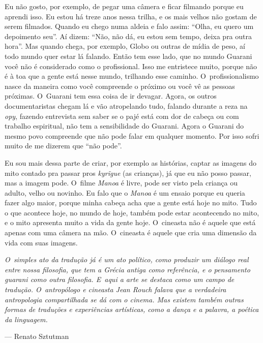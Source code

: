 Eu não gosto, por exemplo, de pegar uma câmera e ficar filmando porque
eu aprendi isso. Eu estou há treze anos nessa trilha, e os mais velhos
não gostam de serem filmados. Quando eu chego numa aldeia e falo assim:
``Olha, eu quero um depoimento seu''. Aí dizem: ``Não, não dá, eu estou
sem tempo, deixa pra outra hora''. Mas quando chega, por exemplo, Globo
ou outras de mídia de peso, aí todo mundo quer estar lá falando. Então
tem esse lado, que no mundo Guarani você não é considerado como o
profissional. Isso me entristece muito, porque não é à toa que a gente
está nesse mundo, trilhando esse caminho. O~profissionalismo nasce da
maneira como você compreende o próximo ou você vê as pessoas próximas.
O~Guarani tem essa coisa de ir devagar. Agora, os outros
documentaristas chegam lá e vão atropelando tudo, falando durante a
reza na \emph{opy}, fazendo entrevista sem saber se o pajé está com dor de
cabeça ou com trabalho espiritual, não tem a sensibilidade do Guarani.
Agora o Guarani do mesmo povo compreende que não pode falar em qualquer
momento. Por isso sofri muito de me dizerem que ``não pode''.

Eu sou mais dessa parte de criar, por exemplo as histórias, captar as
imagens do mito contado pra passar pros \emph{kyrĩgue} (as
crianças), já que eu não posso passar, mas a imagem pode. O~filme \emph{Manoa}
é livre, pode ser visto pela criança ou adulto, velho ou novinho. Eu
falo que o \emph{Manoa} é um ensaio porque eu queria fazer algo maior, porque
minha cabeça acha que a gente está hoje no mito. Tudo o que acontece
hoje, no mundo de hoje, também pode estar acontecendo no mito, e o mito
apresenta muito a vida da gente hoje. O~cineasta não é aquele que está
apenas com uma câmera na mão. O~cineasta é aquele que cria uma dimensão
da vida com suas imagens.

\clearpage

\vspace*{\fill}

\begin{flushright}
\begin{minipage}[c]{0.85\textwidth}
\raggedleft
\footnotesize
\emph{O~simples ato da tradução já é um ato político, como produzir um diálogo
real entre nossa filosofia, que tem a Grécia antiga como referência, e
o pensamento guarani como outra filosofia. E~aqui a arte se destaca
como um campo de tradução. O~antropólogo e cineasta Jean Rouch falava
que a verdadeira antropologia compartilhada se dá com o cinema. Mas
existem também outras formas de traduções e experiências artísticas,
como a dança e a palavra, a poética da linguagem.}

\smallskip
\hspace*{\fill}--- Renato Sztutman
\end{minipage}
\end{flushright}

